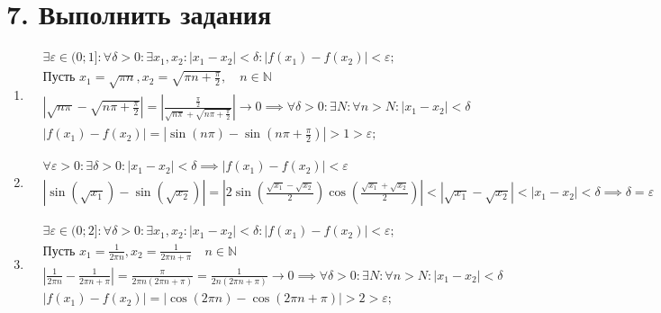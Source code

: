 \documentclass{article}
\begin{document}
\section*{7. Выполнить задания}
\begin{enumerate}
    \item  
    \begin{align*}
        & \exists \varepsilon \in (0; 1]: \forall \delta > 0: \exists x_1, x_2: |x_1 - x_2| < \delta: |f(x_1) - f(x_2)| < \varepsilon; \\
        & \text{Пусть } x_1 = \sqrt{\pi n}, x_2 = \sqrt{\pi n + \frac{\pi}{2}}, \quad n \in \mathbb{N} \\
        & |\sqrt{n\pi} - \sqrt{n\pi + \frac{\pi}{2}}| = |\frac{\frac{\pi}{2}}{\sqrt{n\pi} + {\sqrt{n\pi + \frac{\pi}{2}}}}| \to 0 \implies \forall \delta > 0: \exists N: \forall n > N: |x_1 - x_2| < \delta \\
        & |f(x_1) - f(x_2)| = |\sin (n\pi) - \sin (n\pi + \frac{\pi}{2})| > 1 > \varepsilon;
    \end{align*}
    \item 
    \begin{align*}
        & \forall \varepsilon > 0: \exists \delta > 0: |x_1 - x_2| < \delta \implies |f(x_1) - f(x_2)| < \varepsilon \\
        & |\sin (\sqrt{x_1}) - \sin (\sqrt{x_2})| = 
         |2\sin (\frac{\sqrt{x_1} - \sqrt{x_2}}{2}) \cos (\frac{\sqrt{x_1} + \sqrt{x_2}}{2})| < |\sqrt{x_1} - \sqrt{x_2}|< |x_1 - x_2| < \delta \implies \delta = \varepsilon
    \end{align*}

    \item 
    \begin{align*}
        & \exists \varepsilon \in (0; 2]: \forall \delta > 0: \exists x_1, x_2: |x_1 - x_2| < \delta: |f(x_1) - f(x_2)| < \varepsilon; \\
        & \text{Пусть } x_1 = \frac{1}{2\pi n}, x_2 = \frac{1}{2\pi n + \pi} \quad n \in \mathbb{N} \\
        & |\frac{1}{2\pi n} - \frac{1}{2\pi n + \pi}| = \frac{\pi}{2\pi n (2\pi n + \pi)} = \frac{1}{2n(2\pi n + \pi)} \to 0 \implies \forall \delta > 0: \exists N: \forall n > N: |x_1 - x_2| < \delta \\
        & |f(x_1) - f(x_2)| = |\cos (2\pi n) - \cos (2\pi n + \pi)| > 2 > \varepsilon;
    \end{align*}
\end{enumerate}
\end{document}
